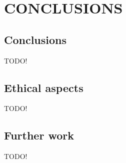 \chapter{CONCLUSIONS}\label{cha:conculsions}
\section{Conclusions}\label{sec:conculsions}
TODO!
\section{Ethical aspects}\label{sec:ethical}
TODO!
\section{Further work}\label{sec:further}
TODO!